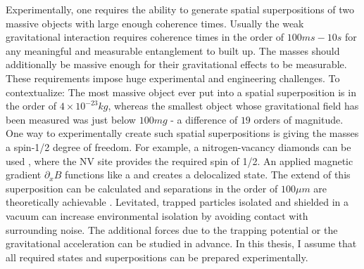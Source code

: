 Experimentally, one requires the ability to generate spatial superpositions of two massive objects with large enough coherence times. Usually the weak gravitational interaction requires coherence times in the order of $100\si{ms} - 10\si{s}$ for any meaningful and measurable entanglement to built up. The masses should additionally be massive enough for their gravitational effects to be measurable.
These requirements impose huge experimental and engineering challenges. To contextualize: The most massive object ever put into a spatial superposition is in the order of $4 \times 10^{-23}\si{kg}$, whereas the smallest object whose gravitational field has been measured was just below $100 \si{mg}$ \cite{Westphal_2021} - a difference of $19$ orders of magnitude.
One way to experimentally create such spatial superpositions is giving the masses a spin-1/2 degree of freedom. For example, a nitrogen-vacancy diamonds can be used \cite{Bose_2017}, where the NV site provides the required spin of 1/2. An applied magnetic gradient $\partial_x B$ functions like a  and creates a delocalized state.
The extend of this superposition can be calculated and separations in the order of $100 \si{\mu m}$ are theoretically achievable \cite{Bose_2017}.
Levitated, trapped particles isolated and shielded in a vacuum can increase environmental isolation by avoiding contact with surrounding noise. The additional forces due to the trapping potential or the gravitational acceleration can be studied in advance. 
In this thesis, I assume that all required states and superpositions can be prepared experimentally.

